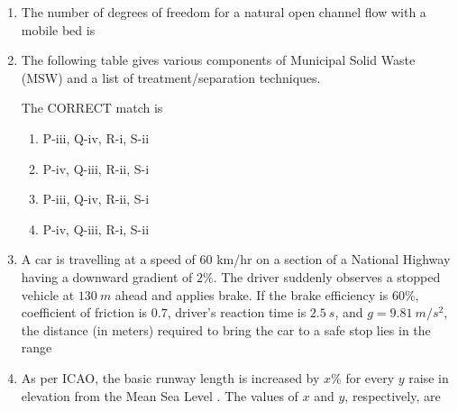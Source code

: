 \documentclass[journal]{IEEEtran}
\begin{document}
\begin{enumerate}
\item The number of degrees of freedom for a natural open channel flow with a mobile bed is  
\hfill {}  
\begin{enumerate}
\end{enumerate}

\item The following table gives various components of Municipal Solid Waste (MSW) 
and a list of treatment/separation techniques.  



The CORRECT match is  
\hfill {}  

\begin{enumerate}
\item P-iii, Q-iv, R-i, S-ii  
\item P-iv, Q-iii, R-ii, S-i  
\item P-iii, Q-iv, R-ii, S-i  
\item P-iv, Q-iii, R-i, S-ii  
\end{enumerate}


\item A car is travelling at a speed of $60$ km/hr on a section of a National Highway having a downward gradient of $2\%$. The driver suddenly observes a stopped vehicle at $130 \ m$ ahead and applies brake. If the brake efficiency is $60\%$, coefficient of friction is $0.7$, driver's reaction time is $2.5 \ s$, and $g = 9.81 \ m/s^2$, the distance (in meters) required to bring the car to a safe stop lies in the range  
\hfill {}  
\begin{enumerate}
\end{enumerate}

\item As per ICAO, the basic runway length is increased by $x \%$ for every $y$  raise in elevation from the Mean Sea Level . The values of $x$ and $y$, respectively, are  
\hfill {}  
\begin{enumerate}
\end{enumerate}


\end{enumerate}
\end{document}
